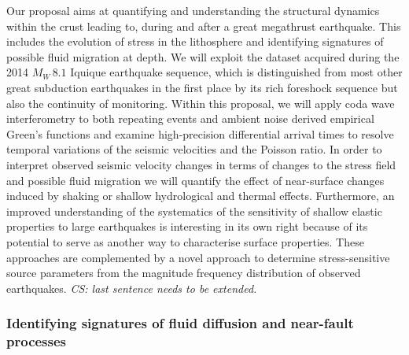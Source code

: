 \documentclass[11pt]{article}
\newcommand{\note}[1]{{\it \color{red} #1}}
\newcommand{\note}[1]{}
\begin{document}
Our proposal aims at quantifying and understanding the structural dynamics within the crust leading to, during and after a great megathrust earthquake. This includes the evolution of stress in the lithosphere and identifying signatures of possible fluid migration at depth. 
We will exploit the dataset acquired during the 2014 $M_W\,8.1$ Iquique earthquake sequence, which is distinguished from most other great subduction earthquakes in the first place by its rich foreshock sequence but also the continuity of monitoring. 
Within this proposal, we will apply coda wave interferometry to both repeating events and ambient noise derived empirical Green's functions and examine high-precision differential arrival times to resolve temporal variations of the seismic velocities and the Poisson ratio. In order to interpret observed seismic velocity changes in terms of changes to the stress field and possible fluid migration we will quantify the effect of near-surface changes induced by shaking or shallow hydrological and thermal effects. Furthermore, an improved understanding of the systematics of the sensitivity of shallow elastic properties to large earthquakes is interesting in its own right because of its potential to serve as another way to characterise surface properties.
These approaches  are complemented by a novel approach to determine stress-sensitive source parameters from the magnitude frequency distribution of observed earthquakes. \note{CS: last sentence needs to be extended.}




\subsubsection{Identifying signatures of fluid diffusion and near-fault processes}
\end{document}
